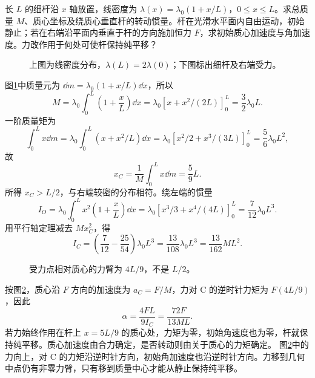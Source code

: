 \begin{exercise}[非均匀杆的质心与偏心受力]\label{sup3:problem-exercise-1}\label{sup3:ex:d3-h1}
长 $L$ 的细杆沿 $x$ 轴放置，线密度为 $\lambda(x)=\lambda_0(1+x/L)$，$0\le x\le L$。求总质量 $M$、质心坐标及绕质心垂直杆的转动惯量。杆在光滑水平面内自由运动，初始静止；若在右端沿平面内垂直于杆的方向施加恒力 $F$，求初始质心加速度与角加速度。力改作用于何处可使杆保持纯平移？
\end{exercise}
\begin{figure}[H]\centering
{}
\caption{上图为线密度分布，$\lambda(L)=2\lambda(0)$；下图标出细杆及右端受力。}\label{sup3:fig:d3-h1-q}
\end{figure}
\begin{solution}
图\ref{sup3:fig:d3-h1-q}中质量元为 $\dd m=\lambda_0(1+x/L)\dd x$，所以
\[
M=\lambda_0\int_0^L\left(1+\frac xL\right)\dd x
=\lambda_0[x+x^2/(2L)]_0^L=\frac32\lambda_0L.
\]
一阶质量矩为
\[
\int_0^Lx\dd m=\lambda_0\int_0^L(x+x^2/L)\dd x
=\lambda_0[x^2/2+x^3/(3L)]_0^L=\frac56\lambda_0L^2,
\]
故
\[
x_C=\frac1M\int_0^Lx\dd m=\frac59L.
\]
所得 $x_C>L/2$，与右端较密的分布相符。绕左端的惯量
\[
I_O=\lambda_0\int_0^Lx^2\left(1+\frac xL\right)\dd x
=\lambda_0[x^3/3+x^4/(4L)]_0^L=\frac7{12}\lambda_0L^3.
\]
用平行轴定理减去 $Mx_C^2$，得
\[
I_C=\left(\frac7{12}-\frac{25}{54}\right)\lambda_0L^3
=\frac{13}{108}\lambda_0L^3=\frac{13}{162}ML^2.
\]
\begin{figure}[H]\centering
{}
\caption{受力点相对质心的力臂为 $4L/9$，不是 $L/2$。}\label{sup3:fig:d3-h1-s}
\end{figure}
按图\ref{sup3:fig:d3-h1-s}，质心沿 $F$ 方向的加速度为 $a_C=F/M$，力对 C 的逆时针力矩为 $F(4L/9)$，因此
\[
\alpha=\frac{4FL}{9I_C}=\frac{72F}{13ML}.
\]
若力始终作用在杆上 $x=5L/9$ 的质心处，力矩为零，初始角速度也为零，杆就保持纯平移。质心加速度由合力确定，是否转动则由关于质心的力矩确定。
图\ref{sup3:fig:d3-h1-s}中的力向上，对 C 的力矩沿逆时针方向，初始角加速度也沿逆时针方向。力移到几何中点仍有非零力臂，只有移到质量中心才能从静止保持纯平移。

\end{solution}


